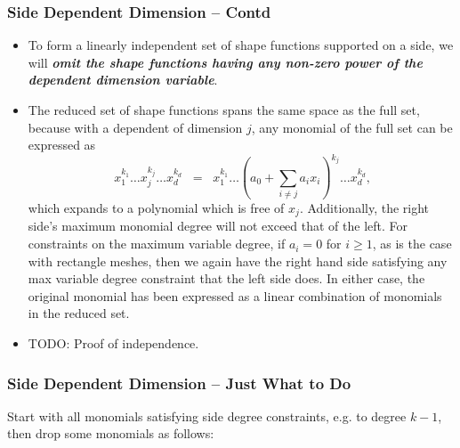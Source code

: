 \documentclass[compress]{beamer}
\begin{document}
\begin{frame}
  \frametitle{Side Dependent Dimension -- Contd}
  \begin{itemize}[<+->]
    \item To form a linearly independent set of shape functions supported on a side, we will \emph{\textbf{omit the shape functions
      having any non-zero power of the dependent dimension variable}}.
    \item The reduced set of shape functions spans the same space as the full set, because with a dependent of dimension $j$,
      any monomial of the full set can be expressed as
       $$x_1^{k_1} \dots x_j^{k_j} \dots x_d^{k_d}
           \;\; = \;\; x_1^{k_1} \dots (a_0 + \sum_{i \ne j} a_i x_{i})^{k_j} \dots x_d^{k_d}\text{,}$$
      which expands to a polynomial which is free of $x_j$. Additionally, the right side's maximum monomial degree will not exceed
      that of the left.  For constraints on the maximum variable degree, if $a_i = 0$ for $i \ge 1$,
      as is the case with rectangle meshes, then we again have the right hand side satisfying any max variable degree constraint
      that the left side does. In either case, the original monomial has been expressed as a linear combination of monomials in the reduced set.
    \item TODO: Proof of independence.
  \end{itemize}
\end{frame}


\begin{frame}
  \frametitle{Side Dependent Dimension -- Just What to Do}
  \pause
  Start with all monomials satisfying side degree constraints, e.g. to degree $k-1$, then drop some monomials as follows:
  \pause
  \pause
\end{frame}
\end{document}
